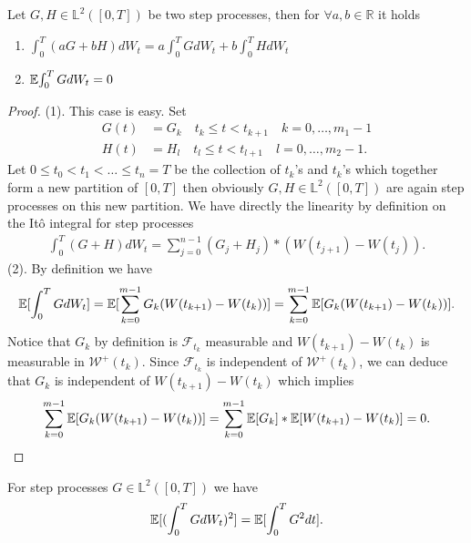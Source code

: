\begin{prop}
  Let $G,H \in  \mathbb{L}^2([0,T])$  be two step processes, then for $\forall  a,b \in  \mathbb{R}$ it holds 
  \begin{enumerate}
    \item $\int_0^{T}(aG + bH)dW_t  = a \int_0^{T} G dW_t + b \int_0^{T} HdW_t  $
    \item $\mathbb{E}{\int_0^{T}GdW_t } = 0$
  \end{enumerate}
\end{prop}
\begin{proof}
  (1). This case is easy. Set 
  \begin{align*}
    G(t) &= G_k \quad t_k \le t <t_{k+1} \quad k=0,\ldots,m_1 -1\\
    H(t) &= H_l \quad t_l \le t <t_{l+1} \quad l=0,\ldots,m_2 -1
  .\end{align*}
  Let $0 \le  t_{0}<t_{1}<\ldots \le t_n=T$ be the collection of $t_k$'s and $t_k$'s which together form a new partition
  of $[0,T]$ then obviously $G,H \in  \mathbb{L}^2([0,T])$ are again step processes on this new partition. We have 
  directly the linearity by definition on the It\^o integral for step processes
  \begin{align*}
    \int_0^{T} (G+H)d W_t = \sum_{j=0}^{n-1} (G_j+H_j)*(W(t_{j+1})-W(t_j))
  .\end{align*}
  (2). By definition we have 
  \begin{align*}
    \mathbb{E}[\int_0^{T} GdW_t ] = \mathbb{E}[\sum_{k=0}^{m-1}G_k(W(t_{k+1})-W(t_k)) ] = \sum_{k=0}^{m-1} \mathbb{E}[G_k(W(t_{k+1})- W(t_k))] 
  .\end{align*}
  Notice that $G_k$ by definition is $\mathcal{F}_{t_k}$ measurable and $W(t_{k+1}) - W(t_k)$ is measurable in $\mathcal{W}^{+}(t_k) $. Since
  $\mathcal{F}_{t_k}$ is independent of $\mathcal{W}^{+}(t_k) $, we can deduce that $G_k$ is independent of $W(t_{k+1}) - W(t_k)$ which implies 
  \begin{align*}
    \sum_{k=0}^{m-1} \mathbb{E}[G_k(W(t_{k+1})- W(t_k))]  = \sum_{k=0}^{m-1} \mathbb{E}[G_k]*\mathbb{E}[W(t_{k+1}) - W(t_k)]  =0
  .\end{align*}
\end{proof}
\begin{lemma}
  For step processes $G \in  \mathbb{L}^2([0,T])$  we have 
  \begin{align*}
    \mathbb{E}[(\int_0^{T} G dW_t )^2] = \mathbb{E}[\int_0^{T} G^2 dt ]
  .\end{align*}
\end{lemma}
